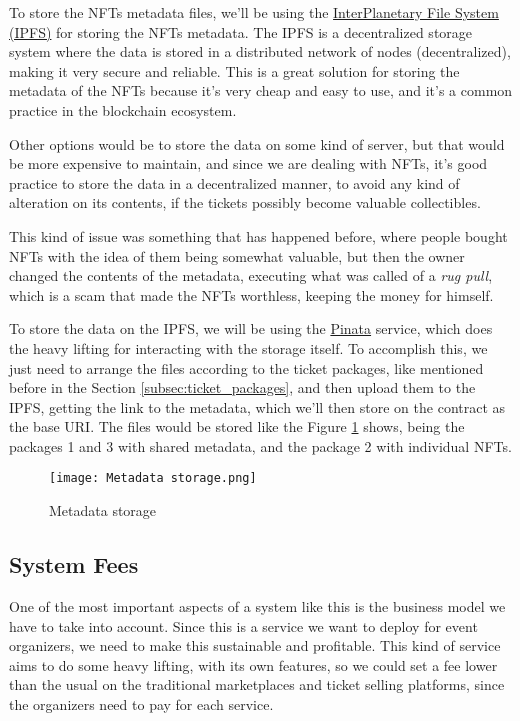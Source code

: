 To store the NFTs metadata files, we'll be using the
\href{https://ipfs.tech/}{InterPlanetary File System (IPFS)} for storing the
NFTs metadata. The IPFS is a decentralized storage system where the data is
stored in a distributed network of nodes (decentralized), making it very secure
and reliable. This is a great solution for storing the metadata of the NFTs
because it's very cheap and easy to use, and it's a common practice in the
blockchain ecosystem.

Other options would be to store the data on some kind of server, but that would
be more expensive to maintain, and since we are dealing with NFTs, it's good
practice to store the data in a decentralized manner, to avoid any kind of
alteration on its contents, if the tickets possibly become valuable
collectibles.

This kind of issue was something that has happened before, where people bought
NFTs with the idea of them being somewhat valuable, but then the owner changed
the contents of the metadata, executing what was called of a \textit{rug pull},
which is a scam that made the NFTs worthless, keeping the money for himself.

To store the data on the IPFS, we will be using the
\href{https://www.pinata.cloud/}{Pinata} service, which does the heavy lifting
for interacting with the storage itself. To accomplish this, we just need to
arrange the files according to the ticket packages, like mentioned before in
the Section \ref{subsec:ticket_packages}, and then upload them to the IPFS,
getting the link to the metadata, which we'll then store on the contract as the
base URI. The files would be stored like the Figure \ref{fig:metadata_storage}
shows, being the packages 1 and 3 with shared metadata, and the package 2 with
individual NFTs.

\begin{figure}[H]
	\texttt{[image: Metadata storage.png]}
	\centering
	\caption{Metadata storage}
	\label{fig:metadata_storage}
\end{figure}

\subsection{System Fees}
\label{subsec:system_fees}

One of the most important aspects of a system like this is the business model
we have to take into account. Since this is a service we want to deploy for
event organizers, we need to make this sustainable and profitable. This kind of
service aims to do some heavy lifting, with its own features, so we could set a
fee lower than the usual on the traditional marketplaces and ticket selling
platforms, since the organizers need to pay for each service.


